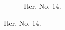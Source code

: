\documentclass[a4paper,12pt]{amsart}
\numberwithin{equation}{section}
\begin{document}
\begin{figure}[h!]
\begin{subfigure}[t]{0.49\textwidth}
    \caption{Iter. No. 14.}
\end{subfigure}


\end{figure}
\end{document}
